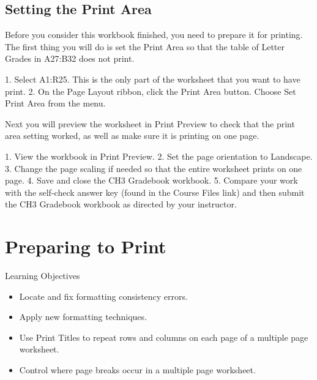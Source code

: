 \subsection{Setting the Print Area}

Before you consider this workbook finished, you need to prepare it for printing. The first thing you
will do is set the Print Area so that the table of Letter Grades in A27:B32 does not print.

1. Select A1:R25. This is the only part of the worksheet that you want to have print.
2. On the Page Layout ribbon, click the Print Area button. Choose Set Print Area from the menu.

Next you will preview the worksheet in Print Preview to check that the print area setting worked, as
well as make sure it is printing on one page.

1.   View the workbook in Print Preview.
2.   Set the page orientation to Landscape.
3.   Change the page scaling if needed so that the entire worksheet prints on one page.
4.   Save and close the CH3 Gradebook workbook.
5.   Compare your work with the self-check answer key (found in the Course Files link) and then
submit the CH3 Gradebook workbook as directed by your instructor.









\section{Preparing to Print}

\begin{center}
	\begin{objbox}{Learning Objectives}
		\begin{itemize}
			\setlength{\itemsep}{0pt}
			\setlength{\parskip}{0pt}
			\setlength{\parsep}{0pt}

			\item Locate and fix formatting consistency errors.
			\item Apply new formatting techniques.
			\item Use Print Titles to repeat rows and columns on each page of a multiple page worksheet.
			\item Control where page breaks occur in a multiple page worksheet.
			
		\end{itemize}
	\end{objbox}
\end{center}



